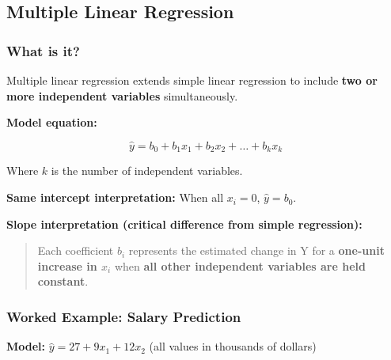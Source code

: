 \documentclass[12pt,openany]{book}
\begin{document}
\begin{center}
\end{center}


\subsection{Multiple Linear Regression}


\subsubsection{What is it?}


Multiple linear regression extends simple linear regression to include \textbf{two or more independent variables} simultaneously.

\textbf{Model equation:}

\[
\hat{y} = b_0 + b_1 x_1 + b_2 x_2 + \dots + b_k x_k
\]


Where \(k\) is the number of independent variables.

\textbf{Same intercept interpretation:} When all \(x_i = 0\), \(\hat{y} = b_0\).

\textbf{Slope interpretation (critical difference from simple regression):}

\begin{quote}
Each coefficient \(b_i\) represents the estimated change in Y for a \textbf{one-unit increase in \(x_i\)} when \textbf{all other independent variables are held constant}.
\end{quote}


\medskip


\subsubsection{Worked Example: Salary Prediction}


\textbf{Model:} \(\hat{y} = 27 + 9x_1 + 12x_2\) (all values in thousands of dollars)
\end{document}

